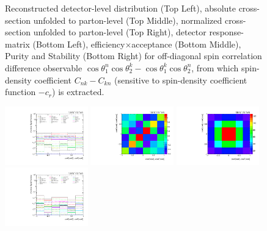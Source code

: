 \begin{refsection}
\begin{figure}[htb]
\begin{center}
\caption{Reconstructed detector-level distribution (Top Left), absolute cross-section unfolded to parton-level (Top Middle), normalized cross-section unfolded to parton-level (Top Right), detector response-matrix (Bottom Left), efficiency$\times$acceptance (Bottom Middle), Purity and Stability (Bottom Right) for off-diagonal spin correlation difference observable $\cos\theta_{1}^{n}\cos\theta_{2}^{k}-\cos\theta_{1}^{k}\cos\theta_{2}^{n}$, from which spin-density coefficient $C_{nk}-C_{kn}$ (sensitive to spin-density coefficient function $-c_r$) is extracted.}
\label{fig:c_Mnk}
\end{center}
\end{figure}
\clearpage
\begin{figure}[htb]
\begin{center}
 \includegraphics[width=0.32\textwidth]{fig_fullRun2UL/unfolding/combined/deltaSystCombinedlog_rebinnedB_c_Mnk.pdf}
 \includegraphics[width=0.32\textwidth]{fig_fullRun2UL/unfolding/combined/StatCovMatrix_rebinnedB_c_Mnk.pdf}
 \includegraphics[width=0.32\textwidth]{fig_fullRun2UL/unfolding/combined/TotalSystCovMatrix_rebinnedB_c_Mnk.pdf} \\
 \includegraphics[width=0.32\textwidth]{fig_fullRun2UL/unfolding/combined/deltaSystCombinedlogNorm_rebinnedB_c_Mnk.pdf}

\end{center}
\end{figure}
\end{refsection}

